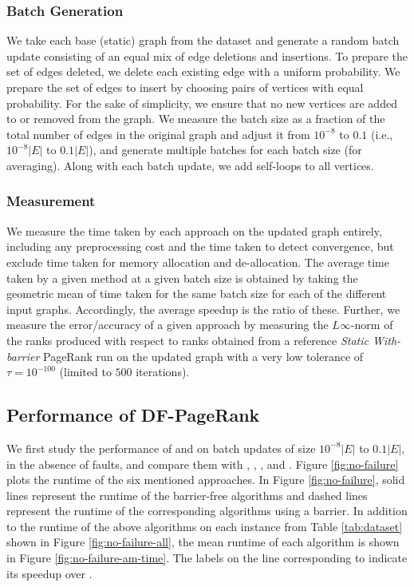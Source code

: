 


\subsubsection{Batch Generation}
\label{sec:batch-generation}

We take each base (static) graph from the dataset and generate a random batch update consisting of an equal mix of edge deletions and insertions. To prepare the set of edges deleted, we delete each existing edge with a uniform probability. We prepare the set of edges to insert by choosing pairs of vertices with equal probability. For the sake of simplicity, we ensure that no new vertices are added to or removed from the graph. We measure the batch size as a fraction of the total number of edges in the original graph and adjust it from $10^{-8}$ to $0.1$ (i.e., $10^{-8}|E|$ to $0.1|E|$), and generate multiple batches for each batch size (for averaging). Along with each batch update, we add self-loops to all vertices.


\subsubsection{Measurement}
\label{sec:measurement}

We measure the time taken by each approach on the updated graph entirely, including any preprocessing cost and the time taken to detect convergence, but exclude time taken for memory allocation and de-allocation. The average time taken by a given method at a given batch size is obtained by taking the geometric mean of time taken for the same batch size for each of the different input graphs. Accordingly, the average speedup is the ratio of these. Further, we measure the error/accuracy of a given approach by measuring the $L\infty$-norm of the ranks produced with respect to ranks obtained from a reference \textit{Static With-barrier} PageRank run on the updated graph with a very low tolerance of $\tau = 10^{-100}$ (limited to $500$ iterations).




\subsection{Performance of DF-PageRank}

We first study the performance of \FroWbar{} and \FroBarf{}  on batch updates of size $10^{-8} |E|$ to $0.1 |E|$, in the absence of faults, and compare them with \StaWbar{}, \StaBarf{}, \NaiWbar{}, and \NaiBarf{}. Figure \ref{fig:no-failure} plots the runtime of the six mentioned approaches. In Figure \ref{fig:no-failure}, solid lines represent the runtime of the barrier-free algorithms and dashed lines represent the runtime of the corresponding algorithms using a barrier. In addition to the runtime of the above algorithms on each instance from Table \ref{tab:dataset} shown in Figure \ref{fig:no-failure-all}, the mean runtime of each algorithm is shown in Figure \ref{fig:no-failure-am-time}. The labels on the line corresponding to \FroBarf{} indicate its speedup over \NaiBarf{}.

